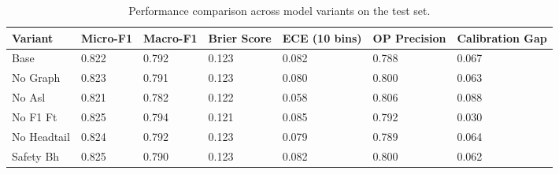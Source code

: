 \begin{table}
\caption{Performance comparison across model variants on the test set.}
\label{tab:variant_comparison}
\begin{tabular}{lllllll}
\toprule
Variant & Micro-F1 & Macro-F1 & Brier Score & ECE (10 bins) & OP Precision & Calibration Gap \\
\midrule
Base & 0.822 & 0.792 & 0.123 & 0.082 & 0.788 & 0.067 \\
No Graph & 0.823 & 0.791 & 0.123 & 0.080 & 0.800 & 0.063 \\
No Asl & 0.821 & 0.782 & 0.122 & 0.058 & 0.806 & 0.088 \\
No F1 Ft & 0.825 & 0.794 & 0.121 & 0.085 & 0.792 & 0.030 \\
No Headtail & 0.824 & 0.792 & 0.123 & 0.079 & 0.789 & 0.064 \\
Safety Bh & 0.825 & 0.790 & 0.123 & 0.082 & 0.800 & 0.062 \\
\bottomrule
\end{tabular}
\end{table}
